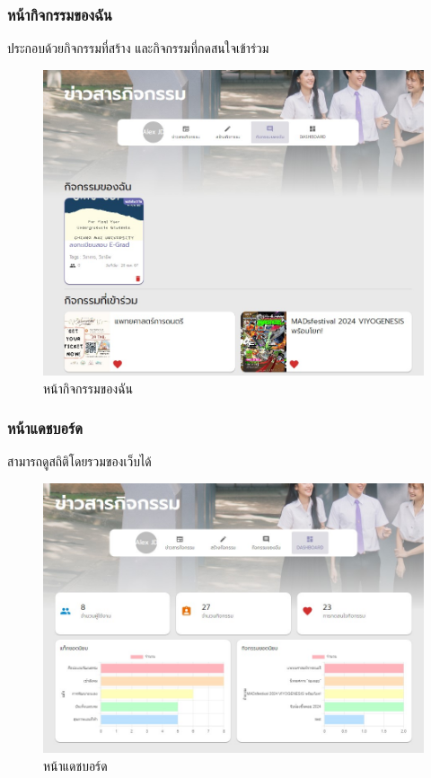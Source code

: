 \subsubsection{หน้ากิจกรรมของฉัน}
ประกอบด้วยกิจกรรมที่สร้าง และกิจกรรมที่กดสนใจเข้าร่วม
\begin{figure}[H]
\begin{center}
\includegraphics[scale=0.4]{public/my-act.jpg}
\end{center}
\caption[หน้ากิจกรรมของฉัน]{หน้ากิจกรรมของฉัน}
\label{fig:my-event-page}
\end{figure}
\subsubsection{หน้าแดชบอร์ด}
สามารถดูสถิติโดยรวมของเว็บได้
\begin{figure}[H]
\begin{center}
\includegraphics[scale=0.5]{public/dash-page.jpg}
\end{center}
\caption[หน้าแดชบอร์ด]{หน้าแดชบอร์ด}
\label{fig:dashboard-page}
\end{figure}
\clearpage
